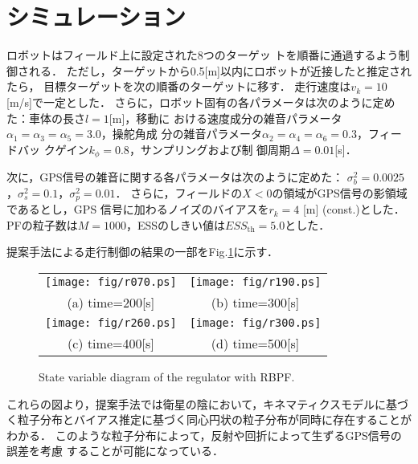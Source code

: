 \documentclass[a4paper,10pt,twocolumn,fleqn]{jsarticle}
\begin{document}
\section{シミュレーション\label{sec:sim}}
\vspace{-2mm}
%
ロボットはフィールド上に設定された8つのターゲッ
トを順番に通過するよう制御される．
%
ただし，ターゲットから0.5[m]以内にロボットが近接したと推定されたら，
目標ターゲットを次の順番のターゲットに移す．
%
%
走行速度は$v_k=10$[m/s]で一定とした．
さらに，ロボット固有の各パラメータは次のように定めた：車体の長さ$l=1$[m]，移動に
おける速度成分の雑音パラメータ$\alpha_1=\alpha_3=\alpha_5=3.0$，操舵角成
分の雑音パラメータ$\alpha_2=\alpha_4=\alpha_6=0.3$，フィードバッ
クゲイン$k_\phi=0.8$，サンプリングおよび制
御周期$\Delta=0.01$[s]．

次に，GPS信号の雑音に関する各パラメータは次のように定めた：
$\sigma_b^2=0.0025$，$\sigma_s^2=0.1$，$\sigma_p^2=0.01$．
さらに，フィールドの$X<0$の領域がGPS信号の影領域であるとし，GPS
信号に加わるノイズのバイアスを$r_k=4$ [m] (const.)とした．
PFの粒子数は$M=1000$，ESSのしきい値は$ESS_{\text{th}}=5.0$とした．

提案手法による走行制御の結果の一部をFig.\ref{fig:res}に示す．
\begin{figure}[bp]
 \begin{center}
 \begin{tabular}{cc}
  \texttt{[image: fig/r070.ps]}& 
  \texttt{[image: fig/r190.ps]}\\
  (a) time=200[s]& (b) time=300[s] \\
  \texttt{[image: fig/r260.ps]}&
  \texttt{[image: fig/r300.ps]}\\
  (c) time=400[s] &(d) time=500[s]
\end{tabular}
 \end{center}
 \caption{State variable diagram of the regulator with RBPF.}
 \label{fig:res}
\end{figure}
これらの図より，提案手法では衛星の陰において，キネマティクスモデルに基づ
く粒子分布とバイアス推定に基づく同心円状の粒子分布が同時に存在することが
わかる．
このような粒子分布によって，反射や回折によって生ずるGPS信号の誤差を考慮
することが可能になっている．
\end{document}
